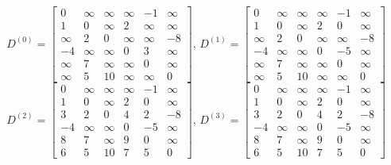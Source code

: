 \documentclass[11pt]{article}
\theoremstyle{definition}
\theoremstyle{theorem}
\begin{document}
\[
D^{(0)} = 
\begin{bmatrix}
0 	& \infty 	& \infty 	& \infty 	& -1		& \infty 	\\
1 	& 0	       	& \infty	& 2		& \infty	& \infty 	\\
\infty	& 2		& 0 		& \infty	& \infty	& -8  	\\
-4	& \infty	& \infty	& 0		& 3		& \infty 	\\
\infty	& 7		& \infty	& \infty	& 0		& \infty 	\\
\infty	& 5		& 10		& \infty	& \infty	& 0
\end{bmatrix}
\text{,       } 
D^{(1)} = 
\begin{bmatrix}
0 	& \infty 	& \infty 	& \infty 	& -1		& \infty 	\\
1 	& 0	       	& \infty	& 2		& 0		& \infty 	\\
\infty	& 2		& 0 		& \infty	& \infty	& -8  	\\
-4	& \infty	& \infty	& 0		& -5		& \infty 	\\
\infty	& 7		& \infty	& \infty	& 0		& \infty 	\\
\infty	& 5		& 10		& \infty	& \infty	& 0
\end{bmatrix}
\]
\[
D^{(2)} = 
\begin{bmatrix}
0 	& \infty 	& \infty 	& \infty 	& -1		& \infty 	\\
1 	& 0	       	& \infty	& 2		& 0		& \infty 	\\
3	& 2		& 0 		& 4		& 2		& -8  	\\
-4	& \infty	& \infty	& 0		& -5		& \infty 	\\
8	& 7		& \infty	& 9		& 0		& \infty 	\\
6	& 5		& 10		& 7		& 5		& 0
\end{bmatrix}
\text{,       } 
D^{(3)} = 
\begin{bmatrix}
0 	& \infty 	& \infty 	& \infty 	& -1		& \infty 	\\
1 	& 0	       	& \infty	& 2		& 0		& \infty 	\\
3	& 2		& 0 		& 4		& 2		& -8  	\\
-4	& \infty	& \infty	& 0		& -5		& \infty 	\\
8	& 7		& \infty	& 9		& 0		& \infty 	\\
6	& 5		& 10		& 7		& 5		& 0
\end{bmatrix}
\]
\end{document}
